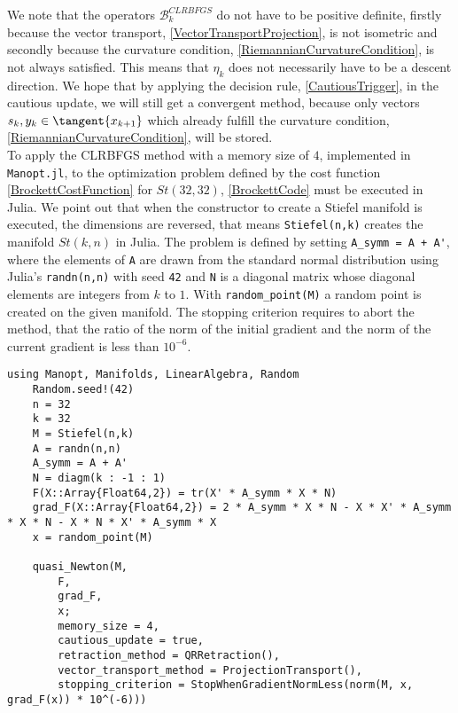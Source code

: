 We note that the operators $\mathcal{B}^{CLRBFGS}_k$ do not have to be positive definite, firstly because the vector transport, \cref{VectorTransportProjection}, is not isometric and secondly because the curvature condition, \cref{RiemannianCurvatureCondition}, is not always satisfied. This means that $\eta_k$ does not necessarily have to be a descent direction. We hope that by applying the decision rule, \cref{CautiousTrigger}, in the cautious update, we will still get a convergent method, because only vectors $s_k, y_k \in \tangent{x_{k+1}}$ which already fulfill the curvature condition, \cref{RiemannianCurvatureCondition}, will be stored. \\
To apply the CLRBFGS method with a memory size of $4$, implemented in \lstinline!Manopt.jl!, to the optimization problem defined by the cost function \cref{BrockettCostFunction} for $St(32,32)$, \cref{BrockettCode} must be executed in Julia. We point out that when the constructor to create a Stiefel manifold is executed, the dimensions are reversed, that means \lstinline!Stiefel(n,k)! creates the manifold $St(k,n)$ in Julia. The problem is defined by setting \lstinline!A_symm = A + A'!, where the elements of \lstinline!A! are drawn from the standard normal distribution using Julia’s \lstinline!randn(n,n)! with seed \lstinline!42! and \lstinline!N! is a diagonal matrix whose diagonal elements are integers from $k$ to $1$. With \lstinline!random_point(M)! a random point is created on the given manifold. The stopping criterion requires to abort the method, that the ratio of the norm of the initial gradient and the norm of the current gradient is less than $10^{-6}$. \\ 

\begin{lstlisting}[caption={The Brockett cost function experiment in Julia for $n = 32, k = 32$ and a memory size of $4$.}, label={BrockettCode}]
    using Manopt, Manifolds, LinearAlgebra, Random
    Random.seed!(42)
    n = 32
    k = 32
    M = Stiefel(n,k)
    A = randn(n,n)
    A_symm = A + A' 
    N = diagm(k : -1 : 1)
    F(X::Array{Float64,2}) = tr(X' * A_symm * X * N)
    grad_F(X::Array{Float64,2}) = 2 * A_symm * X * N - X * X' * A_symm * X * N - X * N * X' * A_symm * X
    x = random_point(M)
    
    quasi_Newton(M, 
        F, 
        grad_F, 
        x; 
        memory_size = 4, 
        cautious_update = true,
        retraction_method = QRRetraction(), 
        vector_transport_method = ProjectionTransport(), 
        stopping_criterion = StopWhenGradientNormLess(norm(M, x, grad_F(x)) * 10^(-6))) 
\end{lstlisting}


